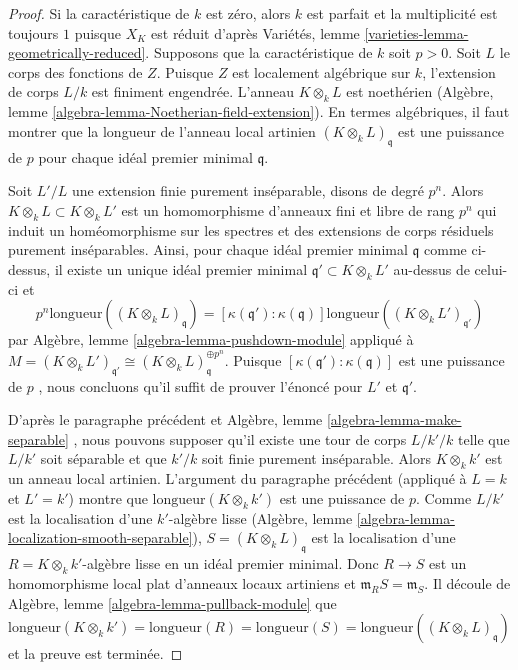 \begin{proof}
 Si la caractéristique de  $k$  est zéro, alors  $k$  est parfait et 
la multiplicité est toujours  $1$  puisque $X_K$ est réduit d'après
 Variétés, lemme  \ref{varieties-lemma-geometrically-reduced}. 
Supposons que la caractéristique de  $k$ soit  $p > 0$. 
Soit  $L$  le corps des fonctions de  $Z$. Puisque  $Z$  est localement algébrique
 sur  $k$, l'extension de corps $L/k$ est finiment engendrée. 
L'anneau  $K \otimes_k L$  est noethérien
 (Algèbre, lemme  \ref{algebra-lemma-Noetherian-field-extension}).
 En termes algébriques, il faut montrer que la longueur de l'anneau
 local artinien  $(K \otimes_k L)_\mathfrak q$
  est une puissance de  $p$ pour chaque idéal premier minimal  $\mathfrak q$. 

\medskip\noindent
 Soit  $L'/L$  une extension finie purement inséparable, disons de degré 
$p^n$. Alors  $K \otimes_k L \subset K \otimes_k L'$  est un homomorphisme
 d'anneaux fini et libre de rang $p^n$  qui induit un homéomorphisme sur les 
spectres et des extensions de corps résiduels purement inséparables. 
Ainsi, pour chaque idéal premier minimal $\mathfrak q$  comme ci-dessus,
 il existe un unique idéal premier minimal 
$\mathfrak q' \subset K \otimes_k L'$  au-dessus de celui-ci et 
$$
p^n \text{longueur}((K \otimes_k L)_\mathfrak q) =
[\kappa(\mathfrak q') : \kappa(\mathfrak q)]
\text{longueur}((K \otimes_k L')_{\mathfrak q'})
$$
 par Algèbre, lemme  \ref{algebra-lemma-pushdown-module}  appliqué 
à  $M = (K \otimes_k L')_{\mathfrak q'} \cong
(K \otimes_k L)_{\mathfrak q}^{\oplus p^n}$. 
Puisque  $[\kappa(\mathfrak q') : \kappa(\mathfrak q)]$  est une puissance
 de  $p$ , nous concluons qu'il suffit de prouver 
l'énoncé pour  $L'$  et  $\mathfrak q'$. 

\medskip\noindent
 D'après le paragraphe précédent et Algèbre, lemme  \ref{algebra-lemma-make-separable} , nous 
pouvons supposer qu'il existe une tour de corps $L/k'/k$ telle que $L/k'$ soit séparable et
 que $k'/k$ soit finie purement inséparable. Alors  $K \otimes_k k'$ est 
un anneau local artinien. L'argument du paragraphe précédent 
(appliqué à $L = k$  et  $L' = k'$) montre que  $\text{longueur}(K \otimes_k k')$
  est une puissance de $p$. Comme $L/k'$ est la localisation 
d'une $k'$-algèbre 
lisse (Algèbre, lemme \ref{algebra-lemma-localization-smooth-separable}),
 $S = (K \otimes_k L)_\mathfrak q$ est la localisation d'une 
$R = K \otimes_k k'$-algèbre lisse en un idéal premier minimal.
 Donc  $R \to S$  est un homomorphisme local plat d'anneaux 
locaux artiniens et  $\mathfrak m_R S = \mathfrak m_S$. Il
 découle de Algèbre, lemme  \ref{algebra-lemma-pullback-module}  que  
$\text{longueur}(K \otimes_k k') = \text{longueur}(R) =
\text{longueur}(S) = \text{longueur}((K \otimes_k L)_\mathfrak q)$
  et la preuve est terminée. 
\end{proof} 

